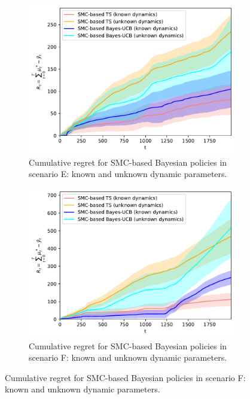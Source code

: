 \begin{figure}[!ht]
	\begin{subfigure}[b]{0.47\textwidth}
		\includegraphics[width=\textwidth]{./fods_figs/dynamic/softmax/e_M2000_cumulative_regret_dunknown}
		\caption{Cumulative regret for SMC-based Bayesian policies in scenario E: known and unknown dynamic parameters.}
		\label{fig:dynamic_bandits_e_softmax_cstatic}%
	\end{subfigure}\qquad
	\begin{subfigure}[b]{0.47\textwidth}
		\includegraphics[width=\textwidth]{./fods_figs/dynamic/softmax/f_M2000_cumulative_regret_dunknown}
		\caption{Cumulative regret for SMC-based Bayesian policies in scenario F: known and unknown dynamic parameters.}
		\label{fig:dynamic_bandits_f_softmax_cstatic}%
	\end{subfigure}
	

\end{figure}
